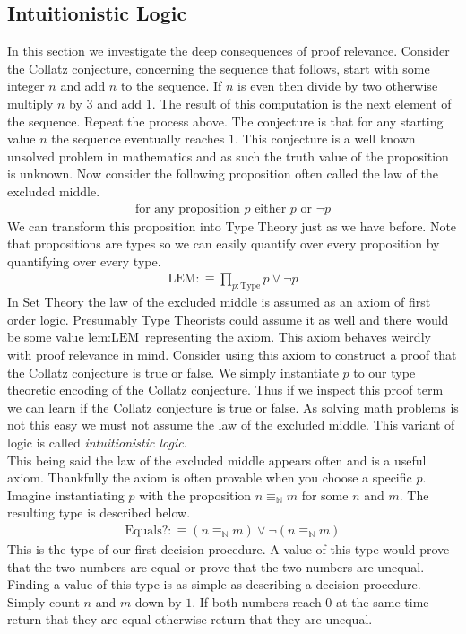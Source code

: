 \documentclass[./Thesis.tex]{subfiles}
\begin{document}
\subsection{Intuitionistic Logic}
In this section we investigate the deep consequences of proof relevance.
Consider the Collatz conjecture, concerning the sequence that follows, start with some
integer $n$ and add $n$ to the sequence. If $n$ is even then divide by two
otherwise multiply $n$ by $3$ and add $1$. The result of this computation is the
next element of the sequence. Repeat the process above. The conjecture is
that for any starting value $n$ the sequence eventually reaches $1$. This
conjecture is a well known unsolved problem in mathematics and as such the truth
value of the proposition is unknown. Now consider the following proposition
often called the law of the excluded middle.
\begin{align}
  \label{eqn:set-LEM}
  \text{for any proposition } p \text{ either } p \text{ or } \neg p
\end{align}
We can transform this proposition into Type Theory just as we have before. Note
that propositions are types so we can easily quantify over every proposition by
quantifying over every type.
\begin{align}
  \label{eqn:type-LEM}
  \text{LEM} :\equiv \prod_{p  : \text{Type}} p \vee \neg p
\end{align}
In Set Theory the law of the excluded middle is assumed as an axiom of first
order logic. Presumably Type Theorists could assume it as well and there would
be some value $\text{lem} : \text{LEM}$ representing the axiom. This axiom behaves weirdly
with proof relevance in mind. Consider using this axiom to construct a proof
that the Collatz conjecture is true or false. We simply instantiate $p$ to our
type theoretic encoding of the Collatz conjecture. Thus if we inspect this proof
term we can learn if the Collatz conjecture is true or false. As solving math
problems is not this easy we must not assume the law of the excluded middle.
This variant of logic is called \textit{intuitionistic logic}. \\

This being said the law of the excluded middle appears often
and is a useful axiom. Thankfully the axiom is often provable when you choose a
specific $p$. Imagine instantiating $p$ with the proposition
$n \equiv_{\mathbb{N}} m$ for some $n$ and $m$.
The resulting type is described below.
\begin{align}
  \label{eqn:nat-dec}
  \text{Equals?} :\equiv (n \equiv_{\mathbb{N}} m) \vee \neg (n \equiv_{\mathbb{N}} m)
\end{align}
This is the type of our first decision procedure. A value of this type would
prove that the two numbers are equal or prove that the two numbers are unequal.
Finding a value of this type is as simple as describing a decision procedure.
Simply count $n$ and $m$ down by $1$. If both numbers reach $0$ at the same time
return that they are equal otherwise return that they are unequal. \\
\end{document}
